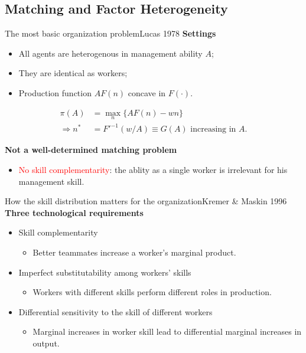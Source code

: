 \documentclass{beamer}
\begin{document}
\subsection{Matching and Factor Heterogeneity}
\begin{frame}[shrink]
	\transfade %
	\tableofcontents[sectionstyle=show/shaded,subsectionstyle=show/shaded/hide]
	\addtocounter{framenumber}{-1}
\end{frame}
\begin{frame}{The most basic organization problem}{Lucas 1978}
	\textbf{Settings}
	\begin{itemize}
		\item All agents are heterogenous in management ability $A$;
		\item They are identical as workers;
		\item Production function $AF(n)$ concave in $F(\cdot)$.
	\end{itemize}
	\medskip
	\begin{equation}
		\begin{aligned}
			\pi(A) &= \max_n \{AF(n)-wn\} \\
			\Rightarrow n^* &= F'^{-1}(w/A)\equiv G(A) \mbox{ increasing in }A.
		\end{aligned}
	\end{equation}
	\medskip
	\medskip

	\textbf{Not a well-determined matching problem}
	\begin{itemize}
		\item \textcolor{red}{No skill complementarity}: the ablity as a single worker is irrelevant for his management skill.
	\end{itemize}
\end{frame}
\begin{frame}{How the skill distribution matters for the organization}{Kremer \& Maskin 1996}
	\textbf{Three technological requirements}
	\medskip
	\begin{itemize}
		\item Skill complementarity
		\begin{itemize}
			\item Better teammates increase a worker's marginal product.
		\end{itemize}
		\medskip
		\item Imperfect substitutability among workers' skills
		\begin{itemize}
			\item Workers with different skills perform different roles in production.
		\end{itemize}
		\medskip
		\item Differential sensitivity to the
		skill of different workers
		\begin{itemize}
			\item Marginal increases in worker skill lead to differential marginal increases in output.
		\end{itemize}
	\end{itemize}
\end{frame}
\end{document}
